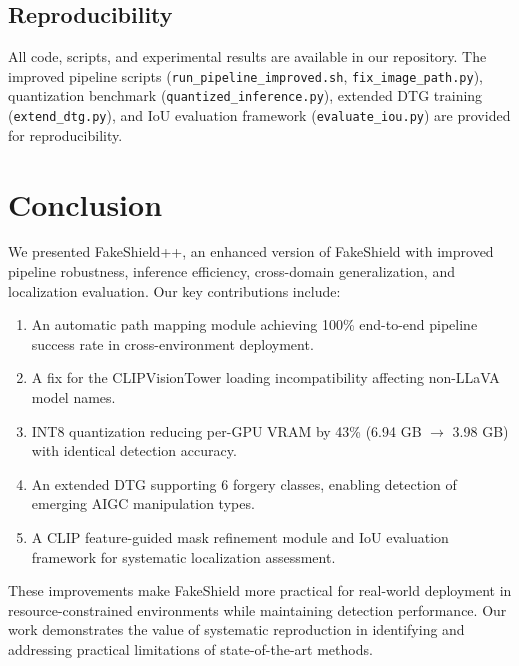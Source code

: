 \subsection{Reproducibility}

All code, scripts, and experimental results are available in our repository. The improved pipeline scripts (\texttt{run\_pipeline\_improved.sh}, \texttt{fix\_image\_path.py}), quantization benchmark (\texttt{quantized\_inference.py}), extended DTG training (\texttt{extend\_dtg.py}), and IoU evaluation framework (\texttt{evaluate\_iou.py}) are provided for reproducibility.

\section{Conclusion}
\label{sec:conclusion}

We presented FakeShield++, an enhanced version of FakeShield with improved pipeline robustness, inference efficiency, cross-domain generalization, and localization evaluation. Our key contributions include:

\begin{enumerate}
    \item An automatic path mapping module achieving 100\% end-to-end pipeline success rate in cross-environment deployment.
    \item A fix for the CLIPVisionTower loading incompatibility affecting non-LLaVA model names.
    \item INT8 quantization reducing per-GPU VRAM by 43\% (6.94 GB $\rightarrow$ 3.98 GB) with identical detection accuracy.
    \item An extended DTG supporting 6 forgery classes, enabling detection of emerging AIGC manipulation types.
    \item A CLIP feature-guided mask refinement module and IoU evaluation framework for systematic localization assessment.
\end{enumerate}

These improvements make FakeShield more practical for real-world deployment in resource-constrained environments while maintaining detection performance. Our work demonstrates the value of systematic reproduction in identifying and addressing practical limitations of state-of-the-art methods.
